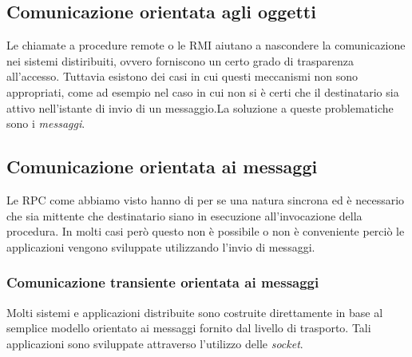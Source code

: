 \subsection{Comunicazione orientata agli oggetti}
Le chiamate a procedure remote o le RMI aiutano a nascondere la comunicazione nei sistemi distiribuiti, ovvero forniscono un certo grado di trasparenza all'accesso. Tuttavia esistono dei casi in cui questi meccanismi non sono appropriati, come ad esempio nel caso in cui non si è certi che il destinatario  sia attivo nell'istante di invio di un messaggio.La soluzione a queste problematiche sono i \emph{messaggi}.
\subsection{Comunicazione orientata ai messaggi}
Le RPC come abbiamo visto hanno di per se una natura sincrona ed è necessario che sia mittente che destinatario siano in esecuzione all'invocazione della procedura. In molti casi però questo non è possibile o non è conveniente perciò le applicazioni vengono sviluppate utilizzando l'invio di messaggi.
\subsubsection{Comunicazione transiente orientata ai messaggi}
Molti sistemi e applicazioni distribuite sono costruite direttamente in base al semplice modello orientato ai messaggi fornito dal livello di trasporto. Tali applicazioni sono sviluppate attraverso l'utilizzo delle \emph{socket}.
